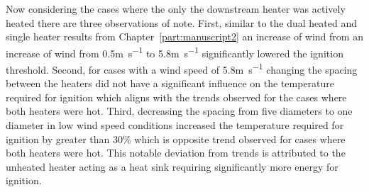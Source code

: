     Now considering the cases where the only the downstream heater was actively heated there are three observations of note. First, similar to the dual heated and single heater results from Chapter~\ref{part:manuscript2} an increase of wind from an increase of wind from 0.5\si{\meter\per\second} to 5.8\si{\meter\per\second} significantly lowered the ignition threshold. Second, for cases with a wind speed of 5.8\si{\meter\per\second} changing the spacing between the heaters did not have a significant influence on the temperature required for ignition which aligns with the trends observed for the cases where both heaters were hot. Third, decreasing the spacing from five diameters to one diameter in low wind speed conditions increased the temperature required for ignition by greater than 30\% which is opposite trend observed for cases where both heaters were hot. This notable deviation from trends is attributed to the unheated heater acting as a heat sink requiring significantly more energy for ignition. 
    
